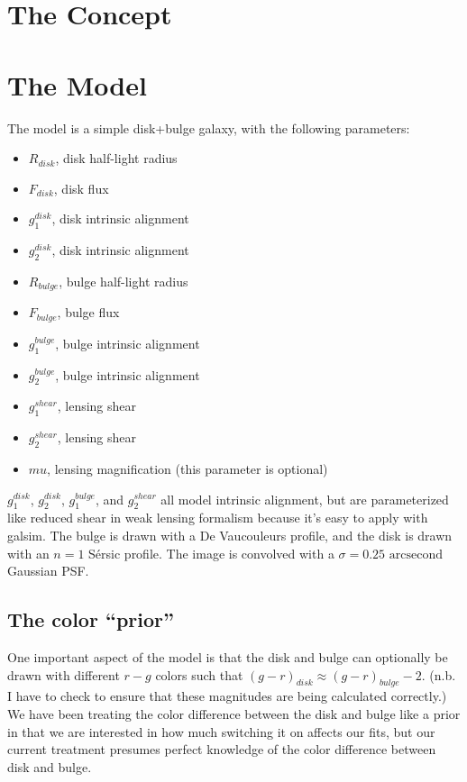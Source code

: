 \documentclass{article}
\begin{document}
\section{The Concept}
 

\section{The Model}
The model is a simple disk+bulge galaxy, with the following parameters:
\begin{itemize}
\item $R_{disk}$, disk half-light radius
\item $F_{disk}$, disk flux
\item $g_1^{disk}$, disk intrinsic alignment
\item $g_2^{disk}$, disk intrinsic alignment
\item $R_{bulge}$, bulge half-light radius
\item $F_{bulge}$, bulge flux
\item $g_1^{bulge}$, bulge intrinsic alignment
\item $g_2^{bulge}$, bulge intrinsic alignment
\item $g_1^{shear}$, lensing shear
\item $g_2^{shear}$, lensing shear
\item $mu$, lensing magnification (this parameter is optional)
\end{itemize}
$g_1^{disk}$, $g_2^{disk}$, $g_1^{bulge}$, and $g_2^{shear}$ all model
intrinsic alignment, but are parameterized like reduced shear in weak
lensing formalism because it's easy to apply with galsim.  The bulge
is drawn with a De Vaucouleurs profile, and the disk is drawn with an
$n=1$ S\'{e}rsic profile.  The image is convolved with a $\sigma = 0.25
\textrm{ arcsecond}$ Gaussian PSF.

\subsection{The color ``prior''}
One important aspect of the model is that the disk and bulge can
optionally be drawn with different $r-g$ colors such that
$(g-r)_{disk} \approx (g-r)_{bulge} - 2$. (n.b. I have to check to
ensure that these magnitudes are being calculated correctly.)  We have
been treating the color difference between the disk and bulge like a
prior in that we are interested in how much switching it on affects
our fits, but our current treatment presumes perfect knowledge of the
color difference between disk and bulge.
\end{document}
